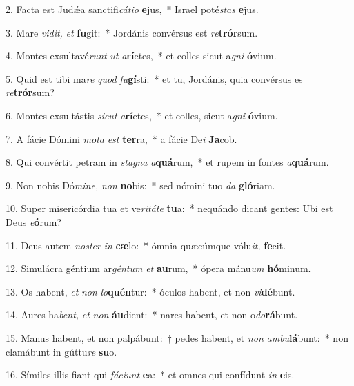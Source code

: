 \item 2. Facta est Judǽa sanctifi\textit{cátio} \textbf{e}jus,~* Israel poté\hspace{0.03em}\textit{stas} \textbf{e}jus.
\item 3. Mare \textit{vidit,} \textit{et} \textbf{fu}git:~* Jordánis convérsus est \textit{re}\textbf{trór}sum.
\item 4. Montes exsultavé\hspace{0.03em}\textit{runt} \textit{ut} \textit{a}\textbf{rí}etes,~* et colles sicut a\textit{gni} \textbf{ó}vium.
\item 5. Quid est tibi ma\hspace{0.03em}\textit{re} \textit{quod} \textit{fu}\textbf{gí}sti:~* et tu, Jordánis, quia convérsus es \textit{re}\textbf{trór}sum?
\item 6. Montes exsultástis \textit{sicut} \textit{a}\textbf{rí}etes,~* et colles, sicut a\textit{gni} \textbf{ó}vium.
\item 7. A fácie Dómini \textit{mota} \textit{est} \textbf{ter}ra,~* a fácie De\textit{i} \textbf{Ja}cob.
\item 8. Qui convértit petram in \textit{stagna} \textit{a}\textbf{quá}rum,~* et rupem in fontes \textit{a}\textbf{quá}rum.
\item 9. Non nobis Dó\textit{mine,} \textit{non} \textbf{no}bis:~* sed nómini tuo \textit{da} \textbf{gló}riam.
\item 10. Super misericórdia tua et ve\hspace{0.03em}\textit{ritáte} \textbf{tu}a:~* nequándo dicant gentes: Ubi est Deus \textit{e}\textbf{ó}rum?
\item 11. Deus autem \textit{noster} \textit{in} \textbf{cæ}lo:~* ómnia quæcúmque vólu\textit{it,} \textbf{fe}cit.
\item 12. Simulácra géntium ar\textit{géntum} \textit{et} \textbf{au}rum,~* ópera mánu\textit{um} \textbf{hó}minum.
\item 13. Os habent, \textit{et} \textit{non} \textit{lo}\textbf{quén}tur:~* óculos habent, et non \textit{vi}\textbf{dé}bunt.
\item 14. Aures ha\hspace{0.03em}\textit{bent,} \textit{et} \textit{non} \textbf{áu}dient:~* nares habent, et non o\textit{do}\textbf{rá}bunt.
\item 15. Manus habent, et non palpábunt:~† pedes habent, et \textit{non} \textit{ambu}\textbf{lá}bunt:~* non clamábunt in gúttu\textit{re} \textbf{su}o.
\item 16. Símiles illis fiant qui \textit{fáciunt} \textbf{e}a:~* et omnes qui confídunt \textit{in} \textbf{e}is.
